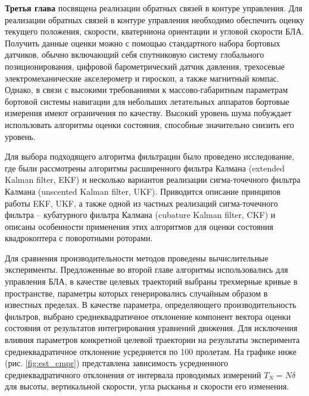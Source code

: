 \textbf{Третья глава} посвящена реализации обратных связей в контуре управления. Для реализации обратных связей в контуре управления необходимо обеспечить оценку текущего положения, скорости, кватерниона ориентации и угловой скорости БЛА. Получить данные оценки можно с помощью стандартного набора бортовых датчиков, обычно включающий себя спутниковую систему глобального позиционирования, цифровой барометрический датчик давления, трехосевые электромеханические акселерометр и гироскоп, а также магнитный компас. Однако, в связи с высокими требованиями к массово-габаритным параметрам бортовой системы навигации для небольших летательных аппаратов бортовые измерения имеют ограничения по качеству. Высокий уровень шума побуждает использовать алгоритмы оценки состояния, способные значительно снизить его уровень.

Для выбора подходящего алгоритма фильтрации было проведено исследование, где были рассмотрены  алгоритмы расширенного фильтра Калмана (extended Kalman filter, EKF) и несколько вариантов реализации сигма-точечного фильтра Калмана (unscented Kalman filter, UKF). Приводится описание принципов работы EKF, UKF, а также одной из частных реализаций сигма-точечного фильтра -- кубатурного фильтра Калмана (cubature Kalman filter, CKF) и описаны особенности применения этих алгоритмов для оценки состояния квадрокоптера с поворотными роторами.

Для сравнения производительности методов проведены вычислительные эксперименты.
Предложенные во второй главе алгоритмы использовались для управления БЛА, в качестве целевых траекторий выбраны трехмерные кривые в пространстве, параметры которых генерировались случайным образом в известных пределах. В качестве параметра, определяющего производительность фильтров,
выбрано среднеквадратичное отклонение компонент вектора оценки состояния от результатов интегрирования уравнений движения.
Для исключения влияния параметров конкретной целевой траектории на результаты эксперимента среднеквадратичное отклонение усредняется по 100 пролетам.
На графике ниже (рис. \ref{fig:est_cmpr}) представлена зависимость усредненного среднеквадратичного отклонения от интервала проводимых измерений $T_N = N\delta$ для высоты, вертикальной скорости, угла рысканья и скорости его изменения.


